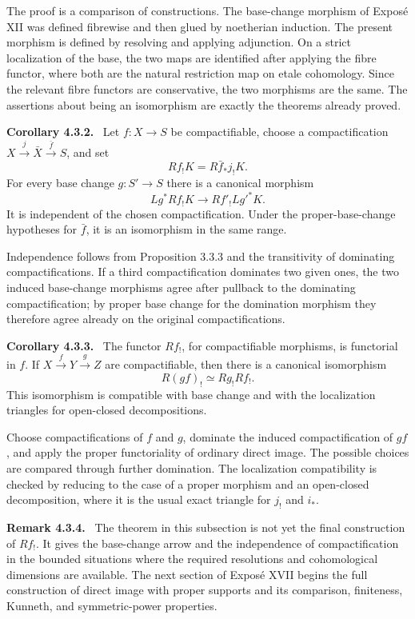 \documentclass[12pt]{article}
\newenvironment{statement}[1]{\par\medskip\noindent\textbf{#1.}\ }{\par\medskip}
\newenvironment{remarktext}[1]{\par\medskip\noindent\textbf{#1.}\ }{\par\medskip}
\begin{document}
The proof is a comparison of constructions. The base-change morphism of Expos\'e XII was defined fibrewise and then glued by noetherian induction. The present morphism is defined by resolving and applying adjunction. On a strict localization of the base, the two maps are identified after applying the fibre functor, where both are the natural restriction map on etale cohomology. Since the relevant fibre functors are conservative, the two morphisms are the same. The assertions about being an isomorphism are exactly the theorems already proved.

\begin{statement}{Corollary 4.3.2}
Let \(f:X\to S\) be compactifiable, choose a compactification \(X\xrightarrow{j}\bar X\xrightarrow{\bar f}S\), and set
\[
Rf_!K=R\bar f_*j_!K.
\]
For every base change \(g:S'\to S\) there is a canonical morphism
\[
Lg^*Rf_!K\to Rf'_!Lg'^*K.
\]
It is independent of the chosen compactification. Under the proper-base-change hypotheses for \(\bar f\), it is an isomorphism in the same range.
\end{statement}

Independence follows from Proposition 3.3.3 and the transitivity of dominating compactifications. If a third compactification dominates two given ones, the two induced base-change morphisms agree after pullback to the dominating compactification; by proper base change for the domination morphism they therefore agree already on the original compactifications.

\begin{statement}{Corollary 4.3.3}
The functor \(Rf_!\), for compactifiable morphisms, is functorial in \(f\). If \(X\xrightarrow{f}Y\xrightarrow{g}Z\) are compactifiable, then there is a canonical isomorphism
\[
R(gf)_!\simeq Rg_!Rf_!.
\]
This isomorphism is compatible with base change and with the localization triangles for open-closed decompositions.
\end{statement}

Choose compactifications of \(f\) and \(g\), dominate the induced compactification of \(gf\), and apply the proper functoriality of ordinary direct image. The possible choices are compared through further domination. The localization compatibility is checked by reducing to the case of a proper morphism and an open-closed decomposition, where it is the usual exact triangle for \(j_!\) and \(i_*\).

\begin{remarktext}{Remark 4.3.4}
The theorem in this subsection is not yet the final construction of \(Rf_!\). It gives the base-change arrow and the independence of compactification in the bounded situations where the required resolutions and cohomological dimensions are available. The next section of Expos\'e XVII begins the full construction of direct image with proper supports and its comparison, finiteness, Kunneth, and symmetric-power properties.
\end{remarktext}
\end{document}
